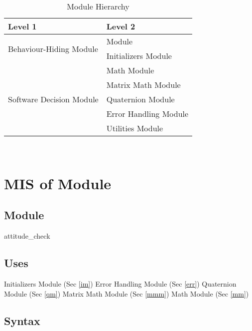 \documentclass[12pt, titlepage]{article}
\begin{document}
\begin{table}[h!]
\centering
\begin{tabular}{p{} p{}}
\toprule
\textbf{Level 1} & \textbf{Level 2}\\
\midrule


\multirow{2}{0.3\textwidth}{Behaviour-Hiding Module} & \progname{} Module \\
  & Initializers Module \\
\midrule
\multirow{5}{0.3\textwidth}{Software Decision Module} & Math Module\\
  & Matrix Math Module \\
  & Quaternion Module \\
  & Error Handling Module \\
  & Utilities Module \\
\bottomrule

\end{tabular}
\caption{Module Hierarchy}
\label{TblMH}
\end{table}

\newpage
~\newpage

\section{MIS of \progname{} Module} \label{ac}

\subsection{Module}
attitude\_check

\subsection{Uses}
Initializers Module (Sec \ref{im}) \newline
Error Handling Module (Sec \ref{err}) \newline
Quaternion Module (Sec \ref{qm})\newline
Matrix Math Module (Sec \ref{mmm}) \newline
Math Module (Sec \ref{mm})

\subsection{Syntax}
\end{document}
